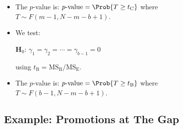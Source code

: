 \begin{itemize}
\begin{itemize}
                  \item The $ p $-value is: $ p\text{-value}=\Prob{T\ge t_\text{C}} $ where $ T \sim F(m-1,N-m-b+1) $.
                  \item We test:
                        \begin{tightcenter}
                              $ \mathbf{H}_0 $: $ \gamma_1=\gamma_2=\cdots=\gamma_{b-1}=0 $
                        \end{tightcenter}
                        using $ t_\text{B}=\text{MS}_\text{B}/\text{MS}_\text{E} $.
                  \item The $ p $-value is: $ p\text{-value}=\Prob{T\ge t_\text{B}} $ where $ T \sim F(b-1,N-m-b+1) $.
            \end{itemize}
\end{itemize}
\subsection{Example: Promotions at The Gap}

